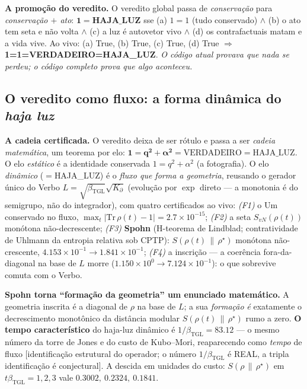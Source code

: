 \documentclass[11pt]{article}
\newcommand{\bTGL}{\beta_{\mathrm{TGL}}}\newcommand{\Msun}{M_{\odot}}\newcommand{\TGL}{\mathrm{TGL}}
\theoremstyle{definition}\newtheorem{deriv}{Derivação}
\begin{document}
\textbf{A promoção do veredito.} O veredito global passa de \emph{conservação} para \emph{conservação $+$ ato}: $\mathbf{1=\text{HAJA\_LUZ}}$ sse (a) $1=1$ (tudo conservado) $\wedge$ (b) o ato tem seta e não volta $\wedge$ (c) a luz é autovetor vivo $\wedge$ (d) os contrafactuais matam e a vida vive. Ao vivo: (a) \textsf{True}, (b) \textsf{True}, (c) \textsf{True}, (d) \textsf{True} $\Rightarrow$ \textbf{1=1=VERDADEIRO=HAJA\_LUZ}. \emph{O código atual provava que nada se perdeu; o código completo prova que algo aconteceu.}

\subsection*{O veredito como fluxo: a forma dinâmica do \emph{haja luz}}

\textbf{A cadeia certificada.} O veredito deixa de ser rótulo e passa a ser \emph{cadeia matemática}, um teorema por elo: $\mathbf{1 = q^2+\alpha^2 = \mathrm{VERDADEIRO} = \mathrm{HAJA\_LUZ}}$. O elo \emph{estático} é a identidade conservada $1=q^2+\alpha^2$ (a fotografia). O elo \emph{dinâmico} ($=$HAJA\_LUZ) é o \emph{fluxo que forma a geometria}, reusando o gerador único do Verbo $L=\sqrt{\bTGL}\sqrt{K_\partial}$ (evolução por $\exp$ direto --- a monotonia é do semigrupo, não do integrador), com quatro certificados ao vivo: \emph{(F1)} o Um conservado no fluxo, $\max_t|\mathrm{Tr}\,\rho(t)-1|=2.7\times10^{-15}$; \emph{(F2)} a seta $S_{vN}(\rho(t))$ monótona não-decrescente; \emph{(F3)} \textbf{Spohn} (H-teorema de Lindblad; contratividade de Uhlmann da entropia relativa sob CPTP): $S(\rho(t)\,\|\,\rho^\star)$ monótona não-crescente, $4.153\times10^{-1}\to1.841\times10^{-1}$; \emph{(F4)} a inscrição --- a coerência fora-da-diagonal na base de $L$ morre ($1.150\times10^{0}\to7.124\times10^{-1}$): o que sobrevive comuta com o Verbo.

\textbf{Spohn torna ``formação da geometria'' um enunciado matemático.} A geometria inscrita é a diagonal de $\rho$ na base de $L$; a sua \emph{formação} \emph{é} exatamente o decrescimento monotônico da distância modular $S(\rho(t)\,\|\,\rho^\star)$ rumo a zero. \textbf{O tempo característico} do haja-luz dinâmico é $1/\bTGL=83.12$ --- o mesmo número da torre de Jones e do custo de Kubo--Mori, reaparecendo como \emph{tempo} de fluxo [identificação estrutural do operador; o número $1/\bTGL$ é REAL, a tripla identificação é conjectural]. A descida em unidades do custo: $S(\rho\,\|\,\rho^\star)$ em $t\bTGL=1,2,3$ vale $0.3002,\ 0.2324,\ 0.1841$.
\end{document}
